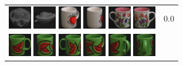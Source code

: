\begin{figure}[bp]
\begin{tabular}{m{11cm} | m{3cm} |}
\includegraphics[width=1cm]{coil/beeld-26.eps}
\includegraphics[width=1cm]{coil/beeld-29.eps}
\includegraphics[width=1cm]{coil/beeld-39.eps}
\includegraphics[width=1cm]{coil/beeld-38.eps}
\includegraphics[width=1cm]{coil/beeld-7.eps}
\includegraphics[width=1cm]{coil/beeld-6.eps}
& {\scriptsize 0.0}
\\
\includegraphics[width=1cm]{coil/beeld-30.eps}
\includegraphics[width=1cm]{coil/beeld-32.eps}
\includegraphics[width=1cm]{coil/beeld-31.eps}
\includegraphics[width=1cm]{coil/beeld-33.eps}
\includegraphics[width=1cm]{coil/beeld-34.eps}
\includegraphics[width=1cm]{coil/beeld-35.eps}

\end{tabular}
\end{figure}

